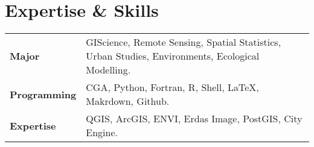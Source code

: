 \section*{Expertise \& Skills}

\begin{tabular}{p{} p{}}
\textbf{Major} & GIScience, Remote Sensing, Spatial Statistics, Urban Studies, Environments, Ecological Modelling.\\
\textbf{Programming} & CGA, Python, Fortran, R, Shell, LaTeX, Makrdown, Github. \\
\textbf{Expertise} & QGIS, ArcGIS, ENVI, Erdas Image, PostGIS, City Engine. \\
\end{tabular}
